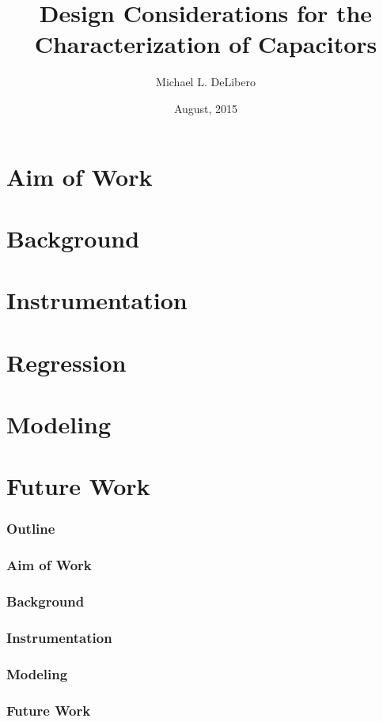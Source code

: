 \documentclass{beamer}
\title{Design Considerations for the Characterization of Capacitors}
\author{Michael L. DeLibero}
\date{August, 2015}
\institute[CWRU]{Case Western Reserve University}
\begin{document}
\section{Aim of Work}
\section{Background}
\section{Instrumentation}
\section{Regression}
\section{Modeling}
\section{Future Work}

\begin{frame}
    \titlepage
\end{frame}

\begin{frame}
  \frametitle{Outline}
  \tableofcontents
\end{frame}

\begin{frame}
    \frametitle{Aim of Work}
\end{frame}

\begin{frame}
    \frametitle{Background}
\end{frame}

\begin{frame}
    \frametitle{Instrumentation}
\end{frame}



\begin{frame}
    \frametitle{Modeling}
\end{frame}

\begin{frame}
    \frametitle{Future Work}
\end{frame}


\end{document}
